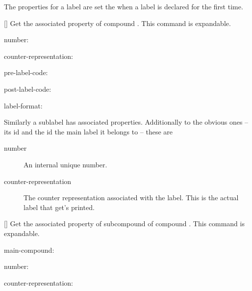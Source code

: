 \documentclass[load-preamble+,babel-options={ngerman,british,american}]{cnltx-doc}
\begin{document}
The properties for a label are set the when a label is declared for the first
time.

\begin{commands}
  \expandable{}[]
    Get the associated property  of compound .  This
    command is expandable.
\end{commands}

\begin{example}
  \def\expandfull{\romannumeral-`0}%
  \def\expandtwice{\detokenize\expandafter\expandafter\expandafter}%
  \ttfamily
  number: \par
  counter-representation: \par
  pre-label-code: \par %
  post-label-code: \par %
  label-format: \expandtwice{\expandfull\cmpdproperty{benzene}{label-format}}
\end{example}

Similarly a sublabel has associated properties.  Additionally to the obvious
ones -- its \ac{id} and the \ac{id} the main label it belongs to -- these
are
\begin{description}
  \item[number] An internal unique number.
  \item[counter-representation] The counter representation associated with the
    label.  This is the actual label that get's printed.
\end{description}

\begin{commands}
  \expandable{}[]
    Get the associated property  of subcompound  of compound .  This command is
    expandable.
\end{commands}

\begin{example}
  \ttfamily
  main-compound: \par
  number: \par
  counter-representation: 
\end{example}
\end{document}
